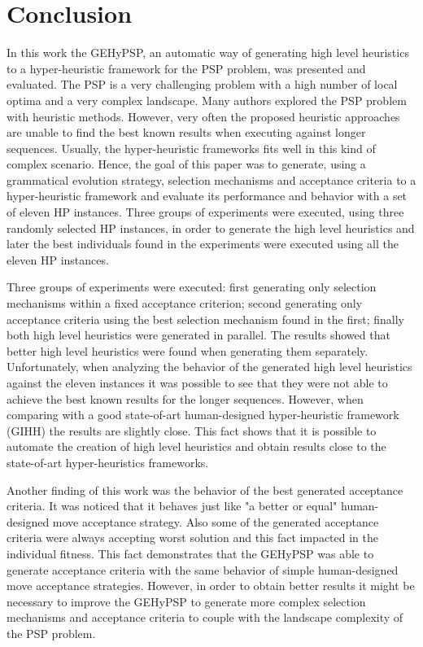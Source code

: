 \documentclass[conference]{IEEEtran}
\begin{document}
\section{Conclusion}
\label{sec:conclusion}
In this work the GEHyPSP, an automatic way of generating high level heuristics to a hyper-heuristic framework for the PSP problem, was presented and evaluated. The PSP is a very challenging problem  with a high number of local optima and a very complex landscape. Many authors explored the PSP problem with heuristic methods. 
However, very often the proposed heuristic approaches are unable to find the best known results when executing against longer sequences. Usually, the hyper-heuristic frameworks fits well in this kind of complex scenario. Hence, the goal of this paper was to generate, using a grammatical evolution strategy, selection mechanisms and acceptance criteria to a hyper-heuristic framework and evaluate its performance and behavior with a set of eleven HP instances. Three groups of experiments were executed, using three randomly selected HP instances, in order to generate the high level heuristics and later the best individuals found in the experiments were executed using all the eleven HP instances. 

Three groups of experiments were executed: first generating only selection mechanisms within a fixed acceptance criterion; second generating only acceptance criteria using the best selection mechanism found in the first; finally both high level heuristics were generated in parallel. The results showed that better high level heuristics were found when generating them separately. Unfortunately, when analyzing the behavior of the generated high level heuristics against the eleven instances it was possible to see that they were not able to achieve the best known results for the longer sequences. However, when comparing with a good state-of-art human-designed hyper-heuristic framework (GIHH) \cite{misir2012intelligent} the results are slightly close. This fact shows that it is possible to automate the creation of high level heuristics and obtain results close to the state-of-art hyper-heuristics frameworks. 

 Another finding of this work was the behavior of the best generated acceptance criteria. It was noticed that it behaves just like "a better or equal" human-designed move acceptance strategy. Also some of the generated acceptance criteria were always accepting worst solution and this fact impacted in the individual fitness. This fact demonstrates that the GEHyPSP was able to generate acceptance criteria with the same behavior of simple human-designed move acceptance strategies. However, in order to obtain better results it might be necessary to improve the GEHyPSP to generate more complex selection mechanisms and acceptance criteria to couple with the landscape complexity of the PSP problem. 
 
\end{document}
